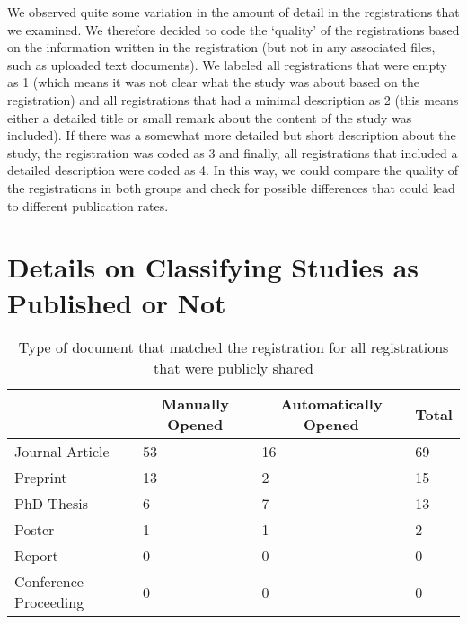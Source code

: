 \documentclass[
  ,jou, a4paper,floatsintext]{apa6}
\begin{document}
We observed quite some variation in the amount of detail in the registrations that we examined. We therefore decided to code the `quality' of the registrations based on the information written in the registration (but not in any associated files, such as uploaded text documents). We labeled all registrations that were empty as 1 (which means it was not clear what the study was about based on the registration) and all registrations that had a minimal description as 2 (this means either a detailed title or small remark about the content of the study was included). If there was a somewhat more detailed but short description about the study, the registration was coded as 3 and finally, all registrations that included a detailed description were coded as 4. In this way, we could compare the quality of the registrations in both groups and check for possible differences that could lead to different publication rates.

\hypertarget{details-on-classifying-studies-as-published-or-not}{%
\section{Details on Classifying Studies as Published or Not}\label{details-on-classifying-studies-as-published-or-not}}

\begin{table*}[tbp]

\begin{center}
\begin{threeparttable}

\caption{\label{tab:publicationtype}Type of document that matched the registration for all registrations that were publicly shared}

\begin{tabular}{llll}
\toprule
 & \multicolumn{1}{c}{Manually Opened} & \multicolumn{1}{c}{Automatically Opened} & \multicolumn{1}{c}{Total}\\
\midrule
Journal Article & 53 & 16 & 69\\
Preprint & 13 & 2 & 15\\
PhD Thesis & 6 & 7 & 13\\
Poster & 1 & 1 & 2\\
Report & 0 & 0 & 0\\
Conference Proceeding & 0 & 0 & 0\\
\bottomrule
\end{tabular}

\end{threeparttable}
\end{center}

\end{table*}
\end{document}
